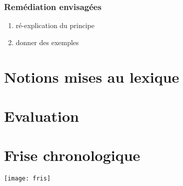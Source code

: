 \documentclass[12pt,french]{report}
\begin{document}
\subsection{Remédiation envisagées }
\begin{enumerate}
	\item ré-explication du principe
	\item donner des exemples 
\end{enumerate}




\chapter{Notions mises au lexique}

\chapter{Evaluation}


\chapter{Frise chronologique}
  
\texttt{[image: fris]}
\end{document}
